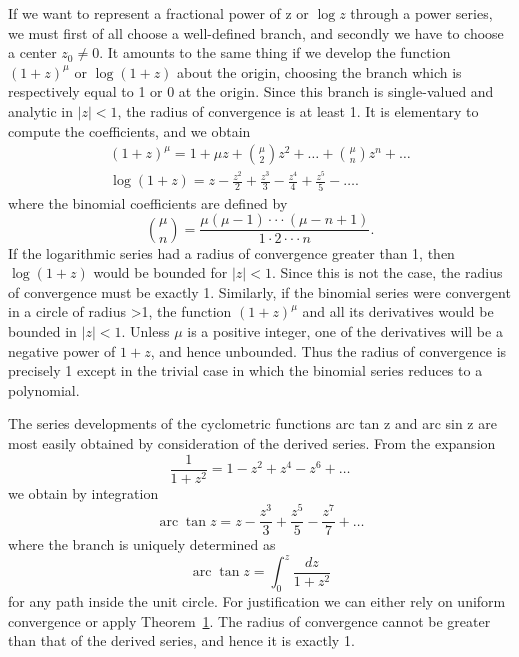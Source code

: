 If we want to represent a fractional power of z or $\log z$ through a power series, we must first of all choose a well-defined branch, and secondly we have to choose a center $z_{0} \neq 0$. It amounts to the same thing if we develop the function $(1 + z)^{\mu}$ or $\log(1 + z)$ about the origin, choosing the branch which is respectively equal to 1 or 0 at the origin. Since this branch is single-valued and analytic in $|z| < 1$, the radius of convergence is at least 1. It is elementary to compute the coefficients, and we obtain
\begin{equation*}
\begin{array}{c} (1 + z) ^ {\mu} = 1 + \mu z + \binom {\mu} {2} z ^ {2} + \dots + \binom {\mu} {n} z ^ {n} + \dots \\ \log (1 + z) = z - \frac {z ^ {2}}{2} + \frac {z ^ {3}}{3} - \frac {z ^ {4}}{4} + \frac {z ^ {5}}{5} - \dots . \end{array}
\end{equation*}
where the binomial coefficients are defined by
\begin{equation*}
\binom {\mu} {n} = \frac {\mu (\mu - 1) \cdot \cdot \cdot (\mu - n + 1)}{1 \cdot 2 \cdot \cdot \cdot n}.
\end{equation*}
If the logarithmic series had a radius of convergence greater than 1, then $\log(1+z)$ would be bounded for $|z|<1$. Since this is not the case, the radius of convergence must be exactly 1. Similarly, if the binomial series were convergent in a circle of radius >1, the function $(1+z)^{\mu}$ and all its derivatives would be bounded in $|z|<1$. Unless $\mu$ is a positive integer, one of the derivatives will be a negative power of $1+z$, and hence unbounded. Thus the radius of convergence is precisely 1 except in the trivial case in which the binomial series reduces to a polynomial.


The series developments of the cyclometric functions arc tan z and arc sin z are most easily obtained by consideration of the derived series. From the expansion
\begin{equation*}
\frac {1}{1 + z ^ {2}} = 1 - z ^ {2} + z ^ {4} - z ^ {6} + \dots
\end{equation*}
we obtain by integration
\begin{equation*}
\operatorname{arc} \tan z = z - \frac {z ^ {3}}{3} + \frac {z ^ {5}}{5} - \frac {z ^ {7}}{7} + \dots
\end{equation*}
where the branch is uniquely determined as
\begin{equation*}
\operatorname{arc} \tan z = \int_ {0} ^ {z} \frac {d z}{1 + z ^ {2}}
\end{equation*}
for any path inside the unit circle. For justification we can either rely on uniform convergence or apply Theorem~\hyperref[thm:5.1]{1}. The radius of convergence cannot be greater than that of the derived series, and hence it is exactly 1.

